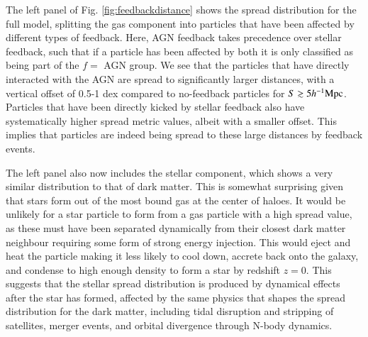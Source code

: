 

The left panel of Fig. \ref{fig:feedbackdistance} shows the spread distribution
for the full \simba{} model, splitting the gas component into particles that
have been affected by different types of feedback. Here, AGN feedback takes
precedence over stellar feedback, such that if a particle has been affected
by both it is only classified as being part of the $f=$ AGN group. We see that
the particles that have directly interacted with the AGN are spread to
significantly larger distances, with a vertical offset of 0.5-1 dex compared
to no-feedback particles for $S \gtrsim 5h^{-1}{\rm Mpc}{}$. Particles that have been
directly kicked by stellar feedback also have systematically higher spread
metric values, albeit with a smaller offset. This implies that particles are
indeed being spread to these large distances by feedback events.

The left panel also now includes the stellar component, which shows a very
similar distribution to that of dark matter. This is somewhat surprising
given that stars form out of the most bound gas at the center of haloes. It
would be unlikely for a star particle to form from a gas particle with a high
spread value, as these must have been separated dynamically from their
closest dark matter neighbour requiring some form of strong energy injection.
This would eject and heat the particle making it less likely to cool down,
accrete back onto the galaxy, and condense to high enough density to form a
star by redshift $z = 0$. This suggests that the stellar spread distribution
is produced by dynamical effects after the star has formed, affected by the
same physics that shapes the spread distribution for the dark matter,
including tidal disruption and stripping of satellites, merger events, and
orbital divergence through N-body dynamics.

